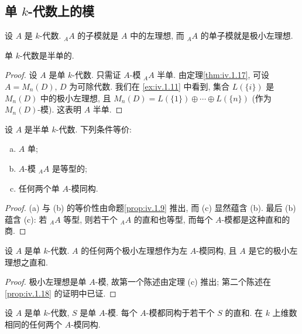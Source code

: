 \subsection*{单 $k$-代数上的模}

设 $A$ 是 $k$-代数. ${}_A A$ 的子模就是 $A$ 中的左理想, 而 ${}_A A$ 的单子模就是极小左理想.

\begin{proposition}\label{prop:iv.1.18}
单 $k$-代数是半单的.
\end{proposition}

\begin{proof}
设 $A$ 是单 $k$-代数. 只需证 $A$-模 ${}_A A$ 半单. 由定理\ref{thm:iv.1.17}, 可设 $A=M_n(D)$, $D$ 为可除代数. 我们在 \ref{ex:iv.1.11} 中看到, 集合 $L(\{i\})$ 是 $M_n(D)$ 中的极小左理想, 且 $M_n(D)=L(\{1\})\oplus\cdots\oplus L(\{n\})$ (作为 $M_n(D)$-模). 这表明 $A$ 半单.
\end{proof}

\begin{theorem}\label{thm:iv.1.19}
设 $A$ 是半单 $k$-代数. 下列条件等价:

\begin{enumerate}[(a)]
\item $A$ 单;
\item $A$-模 ${}_A A$ 是等型的;
\item 任何两个单 $A$-模同构.
\end{enumerate}
\end{theorem}

\begin{proof}
(a) 与 (b) 的等价性由命题\ref{prop:iv.1.9} 推出, 而 (c) 显然蕴含 (b). 最后 (b) 蕴含 (c): 若 ${}_A A$ 等型, 则若干个 ${}_A A$ 的直和也等型, 而每个 $A$-模都是这种直和的商.
\end{proof}

\begin{corollary}\label{cor:iv.1.20}
设 $A$ 是单 $k$-代数. $A$ 的任何两个极小左理想作为左 $A$-模同构, 且 $A$ 是它的极小左理想之直和.
\end{corollary}

\begin{proof}
极小左理想是单 $A$-模, 故第一个陈述由定理 (c) 推出; 第二个陈述在 \ref{prop:iv.1.18} 的证明中已证.
\end{proof}

\begin{corollary}\label{cor:iv.1.21}
设 $A$ 是单 $k$-代数, $S$ 是单 $A$-模. 每个 $A$-模都同构于若干个 $S$ 的直和. 在 $k$ 上维数相同的任何两个 $A$-模同构.
\end{corollary}

